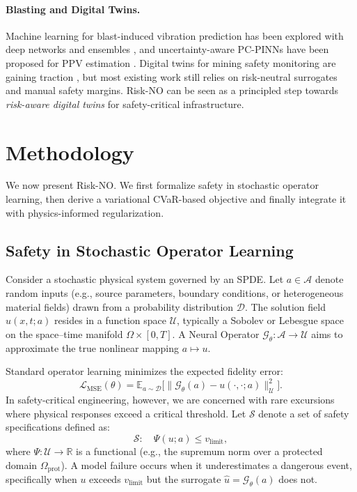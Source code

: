 \documentclass{article}
\newcommand{\E}{\mathbb{E}}
\newcommand{\R}{\mathbb{R}}
\theoremstyle{plain}
\theoremstyle{definition}
\theoremstyle{remark}
\begin{document}
\paragraph{Blasting and Digital Twins.}
Machine learning for blast-induced vibration prediction has been explored with deep networks and ensembles \citep{zhou2023deep}, and uncertainty-aware PC-PINNs have been proposed for PPV estimation \citep{dai2025uncertainty}. Digital twins for mining safety monitoring are gaining traction \citep{wang2024digital}, but most existing work still relies on risk-neutral surrogates and manual safety margins. Risk-NO can be seen as a principled step towards \emph{risk-aware digital twins} for safety-critical infrastructure.

\section{Methodology}
\label{sec:method}

We now present Risk-NO. We first formalize safety in stochastic operator learning, then derive a variational CVaR-based objective and finally integrate it with physics-informed regularization.

\subsection{Safety in Stochastic Operator Learning}
\label{sec:safety_formalism}

Consider a stochastic physical system governed by an SPDE. Let $a \in \mathcal{A}$ denote random inputs (e.g., source parameters, boundary conditions, or heterogeneous material fields) drawn from a probability distribution $\mathcal{D}$. The solution field $u(x,t; a)$ resides in a function space $\mathcal{U}$, typically a Sobolev or Lebesgue space on the space--time manifold $\Omega \times [0,T]$. A Neural Operator $\mathcal{G}_\theta: \mathcal{A} \to \mathcal{U}$ aims to approximate the true nonlinear mapping $a \mapsto u$.

Standard operator learning minimizes the expected fidelity error:
\begin{equation}
    \mathcal{L}_{\text{MSE}}(\theta)
    =
    \E_{a \sim \mathcal{D}} \Big[
        \big\| \mathcal{G}_\theta(a) - u(\cdot,\cdot;a) \big\|_{\mathcal{U}}^2
    \Big].
\end{equation}
In safety-critical engineering, however, we are concerned with rare excursions where physical responses exceed a critical threshold. Let $\mathcal{S}$ denote a set of safety specifications defined as:
\begin{equation}
    \mathcal{S}: \quad
    \Psi(u; a) \leq v_{\text{limit}},
\end{equation}
where $\Psi: \mathcal{U} \to \R$ is a functional (e.g., the supremum norm over a protected domain $\Omega_{\text{prot}}$). A model failure occurs when it underestimates a dangerous event, specifically when $u$ exceeds $v_{\text{limit}}$ but the surrogate $\hat{u} = \mathcal{G}_\theta(a)$ does not.
\end{document}

